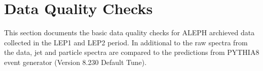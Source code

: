 \section{Data Quality Checks}


This section documents the basic data quality checks for ALEPH archieved data collected in the LEP1 and LEP2 period. In additional to the raw spectra from the data, jet and particle spectra are compared to the predictions from PYTHIA8 event generator (Version 8.230 Default Tune). 


